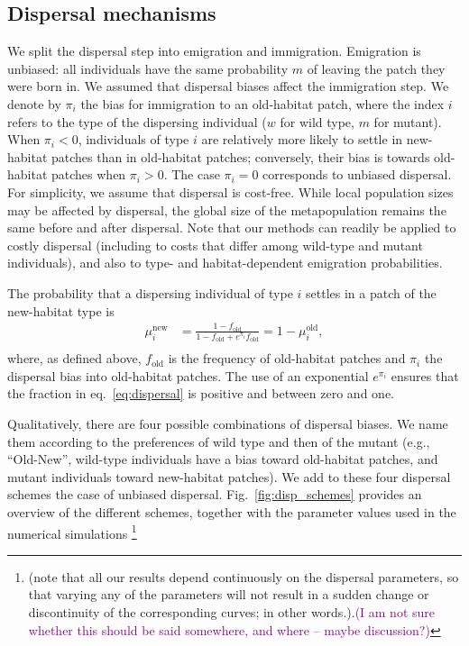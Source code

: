 \documentclass[11pt]{article}
\newcommand{\florence}[1]{\textcolor{purple}{(#1)}} %
\begin{document}
\subsection*{Dispersal mechanisms}

We split the dispersal step into emigration and immigration. Emigration is unbiased: all individuals have the same probability $m$ of leaving the patch they were born in. We assumed that dispersal biases affect the immigration step. 
We denote by $\pi_{i}$ the bias for immigration to an old-habitat patch, where the index $i$ refers to the type of the dispersing individual ($w$ for wild type, $m$ for mutant). When $\pi_i<0$, individuals of type $i$ are relatively more likely to settle in new-habitat patches than in old-habitat patches; conversely, their bias is towards old-habitat patches when $\pi_i>0$. The case $\pi_i=0$ corresponds to unbiased dispersal. 
For simplicity, we assume that dispersal is cost-free. While local population sizes may be affected by dispersal, the global size of the metapopulation remains the same before and after dispersal.  Note that our methods can readily be applied to costly dispersal (including to costs that differ among wild-type and mutant individuals), and also to type- and habitat-dependent emigration probabilities. 

The probability that a dispersing individual of type $i$ settles in a patch of the new-habitat type is
%
\begin{equation}\label{eq:dispersal}
\begin{aligned}
\mu_i^{\text{new}} &= \frac{1-f_{\text{old}}}{1-f_{\text{old}}+ e^{\pi_i} f_{\text{old}}} = 1 - \mu_i^{\text{old}},\\
\end{aligned}
\end{equation}
where, as defined above, $f_{\text{old}}$ is the frequency of old-habitat patches and $\pi_i$ the dispersal bias into old-habitat patches. The use of an exponential $e^{\pi_i}$  ensures that the fraction in eq.~\eqref{eq:dispersal} is positive and between zero and one. 

Qualitatively, there are four possible combinations of dispersal biases. We name them according to the preferences of wild type and then of the mutant (e.g., ``Old-New'', wild-type individuals have a bias toward old-habitat patches, and mutant individuals toward new-habitat patches). We add to these four dispersal schemes the case of unbiased dispersal. Fig.~\ref{fig:disp_schemes} provides an overview of the different schemes, together with the parameter values used in the numerical simulations \footnote{(note that all our results depend continuously on the dispersal parameters, so that varying any of the parameters will not result in a sudden change or discontinuity of the corresponding curves; in other words.).\florence{I am not sure whether this should be said somewhere, and where -- maybe discussion?}} 
\end{document}
